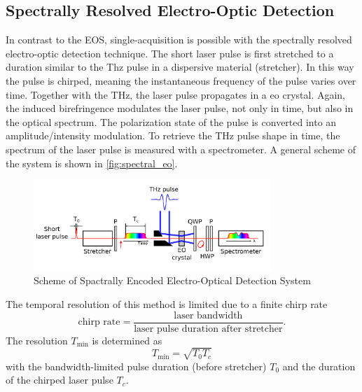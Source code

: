 \subsection{Spectrally Resolved Electro-Optic Detection}
In contrast to the EOS, single-acquisition is possible with the spectrally resolved electro-optic detection technique. %
The short laser pulse is first stretched to a duration similar to the Thz pulse in a dispersive material (stretcher). In this way the pulse is chirped, meaning the instantaneous frequency of the pulse varies over time. Together with the THz, the laser pulse propagates in a \gls{eo} crystal. Again, the induced birefringence modulates the laser pulse, not only in time, but also in the optical spectrum. The polarization state of the pulse is converted into an amplitude/intensity modulation. To retrieve the THz pulse shape in time, the spectrum of the laser pulse is measured with a spectrometer. A general scheme of the system is shown in \autoref{fig:spectral_eo}. \cite{roussel2014}

\begin{figure}[H]
 	\centering
 	\includegraphics[width = 0.8\textwidth]{chap/02-theory/img/spectral_eo}
 	\caption{Scheme of Spactrally Encoded Electro-Optical Detection System \cite{roussel2014}}
 	\label{fig:spectral_eo}
\end{figure}

The temporal resolution of this method is limited due to a finite chirp rate
\begin{equation}
\text{chirp rate} = \frac{\text{laser bandwidth}}{\text{laser pulse duration after stretcher}}.
\end{equation}
The resolution $T_{\text{min}}$ is determined as
\begin{equation}
T_{\text{min}} = \sqrt{T_0 T_c}
\end{equation}
with the bandwidth-limited pulse duration (before stretcher) $T_0$ and the duration of the chirped laser pulse $T_c$.

